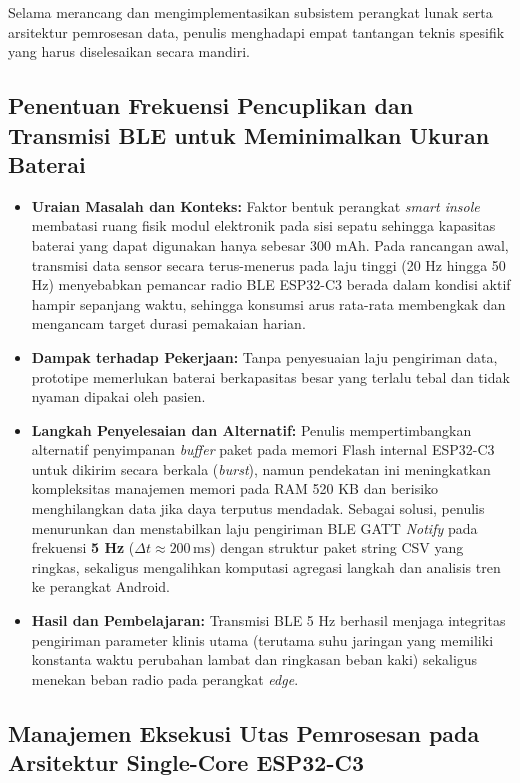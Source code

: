 Selama merancang dan mengimplementasikan subsistem perangkat lunak serta arsitektur pemrosesan data, penulis menghadapi empat tantangan teknis spesifik yang harus diselesaikan secara mandiri.

\subsection{Penentuan Frekuensi Pencuplikan dan Transmisi BLE untuk Meminimalkan Ukuran Baterai}

\begin{itemize}
    \item \textbf{Uraian Masalah dan Konteks:} Faktor bentuk perangkat \textit{smart insole} membatasi ruang fisik modul elektronik pada sisi sepatu sehingga kapasitas baterai yang dapat digunakan hanya sebesar 300 mAh. Pada rancangan awal, transmisi data sensor secara terus-menerus pada laju tinggi (20 Hz hingga 50 Hz) menyebabkan pemancar radio BLE ESP32-C3 berada dalam kondisi aktif hampir sepanjang waktu, sehingga konsumsi arus rata-rata membengkak dan mengancam target durasi pemakaian harian.
    \item \textbf{Dampak terhadap Pekerjaan:} Tanpa penyesuaian laju pengiriman data, prototipe memerlukan baterai berkapasitas besar yang terlalu tebal dan tidak nyaman dipakai oleh pasien.
    \item \textbf{Langkah Penyelesaian dan Alternatif:} Penulis mempertimbangkan alternatif penyimpanan \textit{buffer} paket pada memori Flash internal ESP32-C3 untuk dikirim secara berkala (\textit{burst}), namun pendekatan ini meningkatkan kompleksitas manajemen memori pada RAM 520 KB dan berisiko menghilangkan data jika daya terputus mendadak. Sebagai solusi, penulis menurunkan dan menstabilkan laju pengiriman BLE GATT \textit{Notify} pada frekuensi \textbf{5 Hz} ($\Delta t \approx 200\,\mathrm{ms}$) dengan struktur paket string CSV yang ringkas, sekaligus mengalihkan komputasi agregasi langkah dan analisis tren ke perangkat Android.
    \item \textbf{Hasil dan Pembelajaran:} Transmisi BLE 5 Hz berhasil menjaga integritas pengiriman parameter klinis utama (terutama suhu jaringan yang memiliki konstanta waktu perubahan lambat dan ringkasan beban kaki) sekaligus menekan beban radio pada perangkat \textit{edge}.
\end{itemize}

\subsection{Manajemen Eksekusi Utas Pemrosesan pada Arsitektur Single-Core ESP32-C3}


